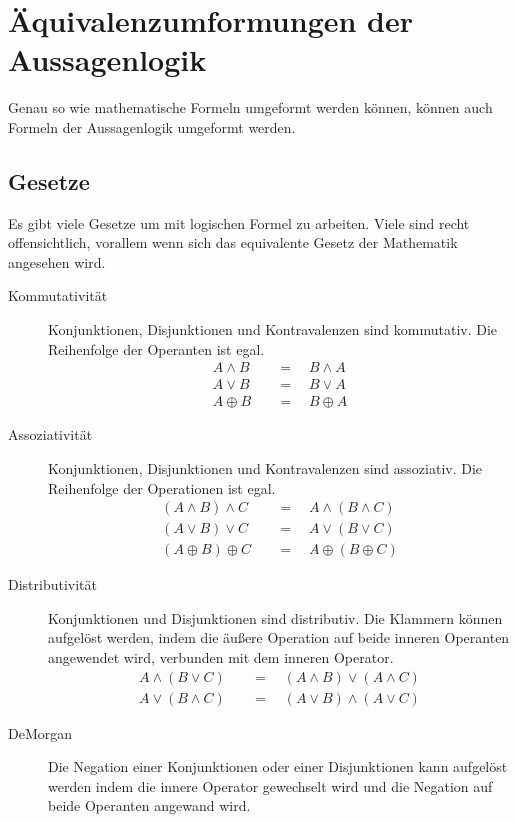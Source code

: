 \documentclass{article}
\newcommand{\feq}{\quad &= \quad}
\begin{document}
\section{Äquivalenzumformungen der Aussagenlogik} \label{sec:logik_umformungen}
Genau so wie mathematische Formeln umgeformt werden können, können auch Formeln der Aussagenlogik umgeformt werden.

\subsection{Gesetze}
Es gibt viele Gesetze um mit logischen Formel zu arbeiten. Viele sind recht offensichtlich, vorallem wenn sich das equivalente Gesetz der Mathematik angesehen wird. 
\begin{description}
 \item[Kommutativität] Konjunktionen, Disjunktionen und Kontravalenzen sind kommutativ. Die Reihenfolge der Operanten ist egal.
\begin{align*}
 A \land B \feq B \land A \\
 A \lor B \feq B \lor A \\
 A \oplus B \feq B \oplus A
\end{align*}
 \item[Assoziativität] Konjunktionen, Disjunktionen und Kontravalenzen sind assoziativ. Die Reihenfolge der Operationen ist egal.
\begin{align*}
 (A \land B) \land C \feq A \land (B \land C) \\
 (A \lor B) \lor C \feq A \lor (B \lor C) \\
 (A \oplus B) \oplus C \feq A \oplus (B \oplus C)
\end{align*}
 \item[Distributivität] Konjunktionen und Disjunktionen sind distributiv. Die Klammern können aufgelöst werden, indem die äußere Operation auf beide inneren Operanten angewendet wird, verbunden mit dem inneren Operator.
\begin{align*}
 A \land (B \lor C) \feq (A \land B) \lor (A \land C) \\
 A \lor (B \land C) \feq (A \lor B) \land (A \lor C)
\end{align*}
 \item[DeMorgan] Die Negation einer Konjunktionen oder einer Disjunktionen kann aufgelöst werden indem die innere Operator gewechselt wird und die Negation auf beide Operanten angewand wird.
\begin{align*}

\end{align*}
\end{description}
\end{document}
